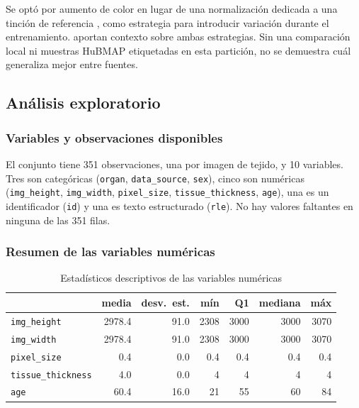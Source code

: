 \documentclass[11pt,letterpaper]{article}
\begin{document}
Se optó por aumento de color en lugar de una normalización dedicada a una tinción de referencia
\parencite{macenko2009stain}, como estrategia para introducir variación durante el entrenamiento.
\textcite{tellez2019stain} aportan contexto sobre ambas estrategias. Sin una comparación local ni
muestras HuBMAP etiquetadas en esta partición, no se demuestra cuál generaliza mejor entre fuentes.

\subsection{Análisis exploratorio}

\subsubsection{Variables y observaciones disponibles}

El conjunto tiene 351 observaciones, una por imagen de tejido, y 10 variables. Tres son categóricas
(\texttt{organ}, \texttt{data\_source}, \texttt{sex}), cinco son numéricas (\texttt{img\_height},
\texttt{img\_width}, \texttt{pixel\_size}, \texttt{tissue\_thickness}, \texttt{age}), una es un
identificador (\texttt{id}) y una es texto estructurado (\texttt{rle}). No hay valores faltantes en
ninguna de las 351 filas.

\subsubsection{Resumen de las variables numéricas}

\begin{table}[H]
\centering
\caption{Estadísticos descriptivos de las variables numéricas}
\begin{tabular}{lrrrrrr}
\toprule
& \textbf{media} & \textbf{desv.\ est.} & \textbf{mín} & \textbf{Q1} & \textbf{mediana} & \textbf{máx} \\
\midrule
\texttt{img\_height}       & 2978.4 & 91.0 & 2308 & 3000 & 3000 & 3070 \\
\texttt{img\_width}        & 2978.4 & 91.0 & 2308 & 3000 & 3000 & 3070 \\
\texttt{pixel\_size}       & 0.4    & 0.0  & 0.4  & 0.4  & 0.4  & 0.4  \\
\texttt{tissue\_thickness} & 4.0    & 0.0  & 4    & 4    & 4    & 4    \\
\texttt{age}               & 60.4   & 16.0 & 21   & 55   & 60   & 84   \\
\bottomrule
\end{tabular}
\end{table}
\end{document}
